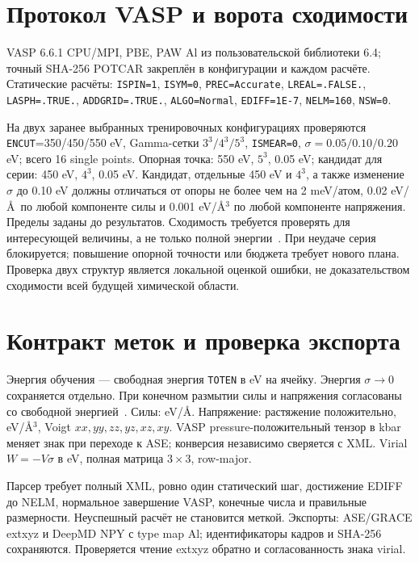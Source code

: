 \documentclass[11pt,a4paper]{article}
\begin{document}
\section{Протокол VASP и ворота сходимости}
VASP 6.6.1 CPU/MPI, PBE, PAW Al из пользовательской библиотеки 6.4;
точный SHA-256 POTCAR закреплён в конфигурации и каждом расчёте.
Статические расчёты: \texttt{ISPIN=1}, \texttt{ISYM=0},
\texttt{PREC=Accurate}, \texttt{LREAL=.FALSE.}, \texttt{LASPH=.TRUE.},
\texttt{ADDGRID=.TRUE.}, \texttt{ALGO=Normal},
\texttt{EDIFF=1E-7}, \texttt{NELM=160}, \texttt{NSW=0}.

На двух заранее выбранных тренировочных конфигурациях проверяются
\texttt{ENCUT}=350/450/550 eV, Gamma-сетки $3^3/4^3/5^3$,
\texttt{ISMEAR=0}, $\sigma=0.05/0.10/0.20$ eV; всего 16 single points.
Опорная точка: 550 eV, $5^3$, 0.05 eV; кандидат для серии:
450 eV, $4^3$, 0.05 eV.
Кандидат, отдельные 450 eV и $4^3$, а также изменение $\sigma$ до 0.10 eV
должны отличаться от опоры не более чем на 2 meV/атом,
0.02 eV/\AA\ по любой компоненте силы и
0.001 eV/\AA$^3$ по любой компоненте напряжения.
Пределы заданы до результатов. Сходимость требуется проверять для интересующей
величины, а не только полной энергии~\cite{encut}.
При неудаче серия блокируется; повышение опорной точности или бюджета требует
нового плана. Проверка двух структур является локальной оценкой ошибки,
не доказательством сходимости всей будущей химической области.

\section{Контракт меток и проверка экспорта}
Энергия обучения --- свободная энергия \texttt{TOTEN} в eV на ячейку.
Энергия $\sigma\to0$ сохраняется отдельно. При конечном размытии силы и
напряжения согласованы со свободной энергией~\cite{smearing}.
Силы: eV/\AA. Напряжение: растяжение положительно,
eV/\AA$^3$, Voigt $xx,yy,zz,yz,xz,xy$.
VASP pressure-положительный тензор в kbar меняет знак при переходе к ASE;
конверсия независимо сверяется с XML. Virial $W=-V\sigma$ в eV,
полная матрица $3\times3$, row-major.

Парсер требует полный XML, ровно один статический шаг, достижение EDIFF до
NELM, нормальное завершение VASP, конечные числа и правильные размерности.
Неуспешный расчёт не становится меткой. Экспорты: ASE/GRACE extxyz и
DeepMD NPY с type map Al; идентификаторы кадров и SHA-256 сохраняются.
Проверяется чтение extxyz обратно и согласованность знака virial.
\end{document}
